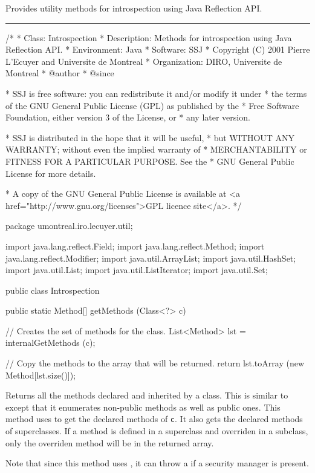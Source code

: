 
Provides utility methods for introspection using
Java Reflection API.

\bigskip\hrule

\begin{code}\begin{hide}
/*
 * Class:        Introspection
 * Description:  Methods for introspection using Java Reflection API.
 * Environment:  Java
 * Software:     SSJ 
 * Copyright (C) 2001  Pierre L'Ecuyer and Universite de Montreal
 * Organization: DIRO, Universite de Montreal
 * @author       
 * @since

 * SSJ is free software: you can redistribute it and/or modify it under
 * the terms of the GNU General Public License (GPL) as published by the
 * Free Software Foundation, either version 3 of the License, or
 * any later version.

 * SSJ is distributed in the hope that it will be useful,
 * but WITHOUT ANY WARRANTY; without even the implied warranty of
 * MERCHANTABILITY or FITNESS FOR A PARTICULAR PURPOSE.  See the
 * GNU General Public License for more details.

 * A copy of the GNU General Public License is available at
   <a href="http://www.gnu.org/licenses">GPL licence site</a>.
 */
\end{hide}
package umontreal.iro.lecuyer.util;\begin{hide}

import java.lang.reflect.Field;
import java.lang.reflect.Method;
import java.lang.reflect.Modifier;
import java.util.ArrayList;
import java.util.HashSet;
import java.util.List;
import java.util.ListIterator;
import java.util.Set;
\end{hide}


public class Introspection\begin{hide} {
   private Introspection() {}\end{hide}

   public static Method[] getMethods (Class<?> c)\begin{hide} {
      // Creates the set of methods for the class.
      List<Method> lst = internalGetMethods (c);

      // Copy the methods to the array that will be returned.
      return lst.toArray (new Method[lst.size()]);
   }\end{hide}
\end{code}
\begin{tabb}   Returns all the methods declared and inherited
 by a class. This is similar to 
 except that it enumerates non-public methods as well as public ones.
 This method uses 
 to get the declared methods of \texttt{c}.
 It also gets the declared methods of superclasses.
 If a method is defined in a superclass and overriden
 in a subclass, only the overriden method will be
 in the returned array.

 Note that since this method uses
 ,
 it can throw a  if
 a security manager is present.
\end{tabb}
